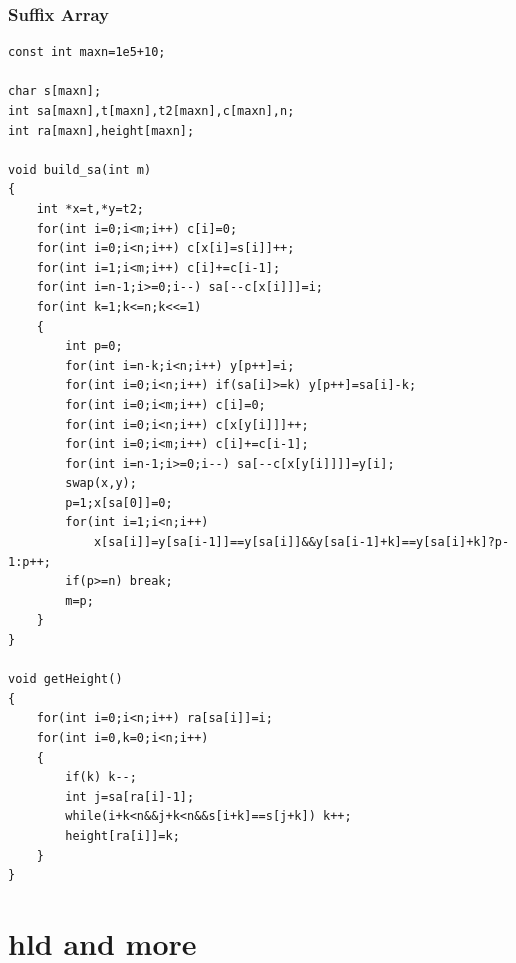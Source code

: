 \documentclass[twoside]{article}
\begin{document}
\subsubsection{Suffix Array}
\begin{lstlisting}
const int maxn=1e5+10;

char s[maxn];
int sa[maxn],t[maxn],t2[maxn],c[maxn],n;
int ra[maxn],height[maxn];

void build_sa(int m)
{
	int *x=t,*y=t2;
	for(int i=0;i<m;i++) c[i]=0;
	for(int i=0;i<n;i++) c[x[i]=s[i]]++;
	for(int i=1;i<m;i++) c[i]+=c[i-1];
	for(int i=n-1;i>=0;i--) sa[--c[x[i]]]=i;
	for(int k=1;k<=n;k<<=1)
	{
		int p=0;
		for(int i=n-k;i<n;i++) y[p++]=i;
		for(int i=0;i<n;i++) if(sa[i]>=k) y[p++]=sa[i]-k;
		for(int i=0;i<m;i++) c[i]=0;
		for(int i=0;i<n;i++) c[x[y[i]]]++;
		for(int i=0;i<m;i++) c[i]+=c[i-1];
		for(int i=n-1;i>=0;i--) sa[--c[x[y[i]]]]=y[i];
		swap(x,y);
		p=1;x[sa[0]]=0;
		for(int i=1;i<n;i++)
			x[sa[i]]=y[sa[i-1]]==y[sa[i]]&&y[sa[i-1]+k]==y[sa[i]+k]?p-1:p++;
		if(p>=n) break;
		m=p;
	}
}

void getHeight()
{
    for(int i=0;i<n;i++) ra[sa[i]]=i;
    for(int i=0,k=0;i<n;i++)
    {
        if(k) k--;
        int j=sa[ra[i]-1];
        while(i+k<n&&j+k<n&&s[i+k]==s[j+k]) k++;
        height[ra[i]]=k;
    }
}
\end{lstlisting}
\clearpage\section{hld and more}
\end{document}
